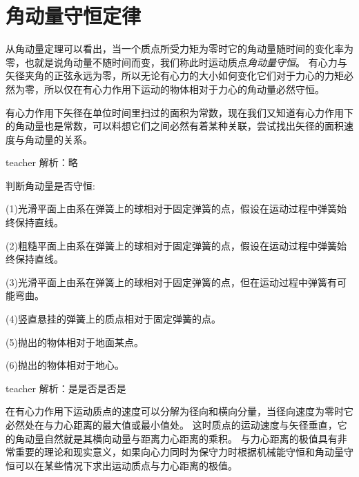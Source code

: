 \section{角动量守恒定律}

从角动量定理可以看出，当一个质点所受力矩为零时它的角动量随时间的变化率为零，也就是说角动量不随时间而变，我们称此时运动质点\emph{角动量守恒}。
有心力与矢径夹角的正弦永远为零，所以无论有心力的大小如何变化它们对于力心的力矩必然为零，所以仅在有心力作用下运动的物体相对于力心的角动量必然守恒。




\begin{example}
有心力作用下矢径在单位时间里扫过的面积为常数，现在我们又知道有心力作用下的角动量也是常数，可以料想它们之间必然有着某种关联，尝试找出矢径的面积速度与角动量的关系。
\begin{taggedblock}{teacher}
\newline
解析：略
\end{taggedblock}
\end{example}




\begin{example}
判断角动量是否守恒:

(1)光滑平面上由系在弹簧上的球相对于固定弹簧的点，假设在运动过程中弹簧始终保持直线。

(2)粗糙平面上由系在弹簧上的球相对于固定弹簧的点，假设在运动过程中弹簧始终保持直线。

(3)光滑平面上由系在弹簧上的球相对于固定弹簧的点，但在运动过程中弹簧有可能弯曲。

(4)竖直悬挂的弹簧上的质点相对于固定弹簧的点。

(5)抛出的物体相对于地面某点。

(6)抛出的物体相对于地心。
\begin{taggedblock}{teacher}
\newline
解析：是是否是否是
\end{taggedblock}
\end{example}

在有心力作用下运动质点的速度可以分解为径向和横向分量，当径向速度为零时它必然处在与力心距离的最大值或最小值处。
这时质点的运动速度与矢径垂直，它的角动量自然就是其横向动量与距离力心距离的乘积。
与力心距离的极值具有非常重要的理论和现实意义，如果向心力同时为保守力时根据机械能守恒和角动量守恒可以在某些情况下求出运动质点与力心距离的极值。





